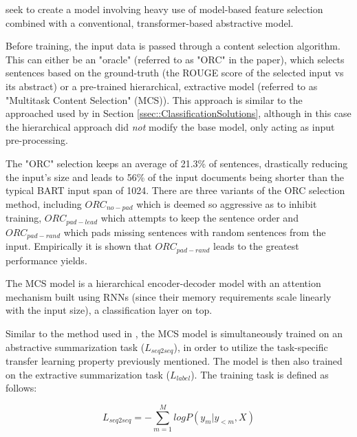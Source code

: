 \documentclass[preprint,review,12pt]{elsarticle}
\begin{document}

\citet{gales} seek to create a model involving heavy use of model-based feature selection combined with a conventional, transformer-based abstractive model. 

Before training, the input data is passed through a content selection algorithm. This can either be an "oracle" (referred to as "ORC" in the paper), which selects sentences based on the ground-truth (the ROUGE score of the selected input vs its abstract) or a pre-trained hierarchical, extractive model (referred to as "Multitask Content Selection" (MCS)). This approach is similar to the approached used by \cite{liu} in Section \ref{ssec::ClassificationSolutions}, although in this case the hierarchical approach did \textit{not} modify the base model, only acting as input pre-processing.

The "ORC" selection keeps an average of 21.3\% of sentences, drastically reducing the input's size and leads to 56\% of the input documents being shorter than the typical BART input span of 1024. There are three variants of the ORC selection method, including $ORC_{no-pad}$ which is deemed so aggressive as to inhibit training, $ORC_{pad-lead}$ which attempts to keep the sentence order and $ORC_{pad-rand}$ which pads missing sentences with random sentences from the input. Empirically it is shown that $ORC_{pad-rand}$ leads to the greatest performance yields.

The MCS model is a hierarchical encoder-decoder model with an attention mechanism built using RNNs (since their memory requirements scale linearly with the input size), a classification layer on top. 

Similar to the method used in \citet{lapata_bert}, the MCS model is simultaneously trained on an abstractive summarization task ($L_{seq2seq}$), in order to utilize the task-specific transfer learning property previously mentioned. The model is then also trained on the extractive summarization task ($L_{label}$). The training task is defined as follows:

\begin{equation}
    L_{seq2seq} = - \sum^{M}_{m=1} logP(y_m | y _{<m}, X)
\end{equation}
\end{document}
